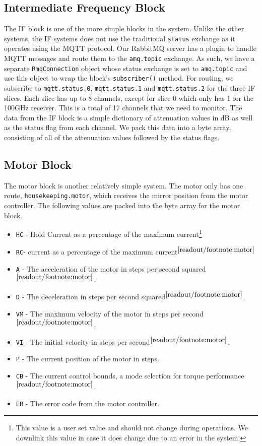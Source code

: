 \subsection{Intermediate Frequency Block}
The IF block is one of the more simple blocks in the system.
Unlike the other systems, the IF systems does not use the traditional \texttt{status} exchange as it operates using the MQTT protocol. 
Our RabbitMQ server has a plugin to handle MQTT messages and route them to the \texttt{amq.topic} exchange. 
As such, we have a separate \texttt{RmqConnection} object whose status exchange is set to \texttt{amq.topic} and use this object to wrap the block's \texttt{subscriber()} method.
For routing, we subscribe to \texttt{mqtt.status.0}, \texttt{mqtt.status.1} and \texttt{mqtt.status.2} for the three IF slices.
Each slice has up to 8 channels, except for slice 0 which only has 1 for the 100GHz receiver. 
This is a total of 17 channels that we need to monitor.
The data from the IF block is a simple dictionary of attenuation values in dB as well as the status flag from each channel.
We pack this data into a byte array, consisting of all of the attenuation values followed by the status flags.

\subsection{Motor Block}
The motor block is another relatively simple system.
The motor only has one route, \texttt{housekeeping.motor}, which receives the mirror position from the motor controller.
The following values are packed into the byte array for the motor block.
\begin{itemize}
    \item \texttt{HC} - Hold Current as a percentage of the maximum current\footnote{\label{readout/footnote:motor}This value is a user set value and should not change during operations. We downlink this value in case it does change due to an error in the system.}
    \item \texttt{RC}- current as a percentage of the maximum current$^{\ref{readout/footnote:motor}}$
    \item \texttt{A} - The acceleration of the motor in steps per second squared$^{\ref{readout/footnote:motor}}$.
    \item \texttt{D} - The deceleration in steps per second squared$^{\ref{readout/footnote:motor}}$.
    \item \texttt{VM} - The maximum velocity of the motor in steps per second$^{\ref{readout/footnote:motor}}$.
    \item \texttt{VI} - The initial velocity in steps per second$^{\ref{readout/footnote:motor}}$.
    \item \texttt{P} - The current position of the motor in steps.
    \item \texttt{CB} - The current control bounds, a mode selection for torque performance$^{\ref{readout/footnote:motor}}$.
    \item \texttt{ER} - The error code from the motor controller.
\end{itemize}

